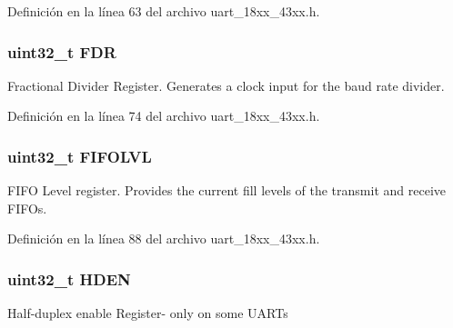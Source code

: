 Definición en la línea 63 del archivo uart\+\_\+18xx\+\_\+43xx.\+h.

\subsubsection[{\texorpdfstring{F\+DR}{FDR}}]{ uint32\+\_\+t F\+DR}\hypertarget{struct_l_p_c___u_s_a_r_t___t_a616cc6e68c464708de180402999a93d6}{}\label{struct_l_p_c___u_s_a_r_t___t_a616cc6e68c464708de180402999a93d6}
Fractional Divider Register. Generates a clock input for the baud rate divider. 

Definición en la línea 74 del archivo uart\+\_\+18xx\+\_\+43xx.\+h.

\subsubsection[{\texorpdfstring{F\+I\+F\+O\+L\+VL}{FIFOLVL}}]{ uint32\+\_\+t F\+I\+F\+O\+L\+VL}\hypertarget{struct_l_p_c___u_s_a_r_t___t_abe3efa91f1a115b49c3d11d6fda600db}{}\label{struct_l_p_c___u_s_a_r_t___t_abe3efa91f1a115b49c3d11d6fda600db}
F\+I\+FO Level register. Provides the current fill levels of the transmit and receive F\+I\+F\+Os. 

Definición en la línea 88 del archivo uart\+\_\+18xx\+\_\+43xx.\+h.

\subsubsection[{\texorpdfstring{H\+D\+EN}{HDEN}}]{ uint32\+\_\+t H\+D\+EN}\hypertarget{struct_l_p_c___u_s_a_r_t___t_ad2368f94732ad41da998cb2eb03cd2e0}{}\label{struct_l_p_c___u_s_a_r_t___t_ad2368f94732ad41da998cb2eb03cd2e0}
Half-\/duplex enable Register-\/ only on some U\+A\+R\+Ts 

